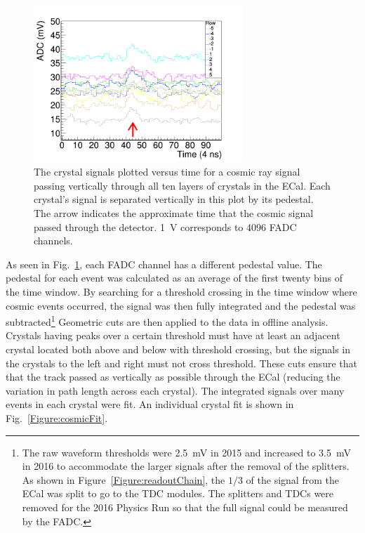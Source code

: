 \begin{figure}[htb]
  \centering
      \includegraphics[width=0.7\textwidth]{pics/performance/cosmicSignal.png}
  \caption[Real cosmic ray signal in raw FADC waveform passing vertically through ECal]{The crystal signals plotted versus time for a cosmic ray signal passing vertically through all ten layers of crystals in the ECal. Each crystal's signal is separated vertically in this plot by its pedestal. The arrow indicates the approximate time that the cosmic signal passed through the detector. 1~V corresponds to 4096 FADC channels.}
  \label{Figure:cosmicSig}
\end{figure}

As seen in Fig.~\ref{Figure:cosmicSig}, each FADC channel has a different pedestal value. The pedestal for each event was calculated as an average of the first twenty bins of the time window. By searching for a threshold crossing in the time window where cosmic events occurred, the signal was then fully integrated and the pedestal was subtracted\footnote{The raw waveform thresholds were 2.5~mV in 2015 and increased to 3.5~mV in 2016 to accommodate the larger signals after the removal of the splitters. As shown in Figure~\ref{Figure:readoutChain}, the $1/3$ of the signal from the ECal was split to go to the TDC modules. The splitters and TDCs were removed for the 2016 Physics Run so that the full signal could be measured by the FADC.} Geometric cuts are then applied to the data in offline analysis. Crystals having peaks over a certain threshold must have at least an adjacent crystal located both above and below with threshold crossing, but the signals in the crystals to the left and right must not cross threshold. These cuts ensure that that the track passed as vertically as possible through the ECal (reducing the variation in path length across each crystal). The integrated signals over many events in each crystal were fit. An individual crystal fit is shown in Fig.~\ref{Figure:cosmicFit}.

